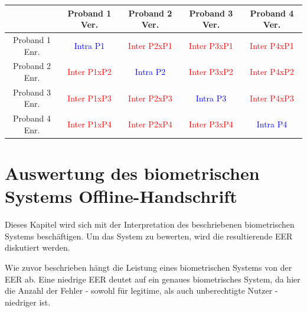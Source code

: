 \documentclass{article}
\begin{document}
\begin{tabular}{ |c|c|c|c|c| } 
  \hline
                 & Proband 1 Ver.               & Proband 2 Ver.               & Proband 3 Ver.               & Proband 4 Ver. \\
  \hline
  Proband 1 Enr. & \textcolor{blue}{Intra P1}   & \textcolor{red}{Inter P2xP1} & \textcolor{red}{Inter P3xP1} & \textcolor{red}{Inter P4xP1} \\
  \hline
  Proband 2 Enr. & \textcolor{red}{Inter P1xP2} & \textcolor{blue}{Intra P2}   & \textcolor{red}{Inter P3xP2} & \textcolor{red}{Inter P4xP2} \\
  \hline
  Proband 3 Enr. & \textcolor{red}{Inter P1xP3} & \textcolor{red}{Inter P2xP3} & \textcolor{blue}{Intra P3}   & \textcolor{red}{Inter P4xP3} \\
  \hline
  Proband 4 Enr. & \textcolor{red}{Inter P1xP4} & \textcolor{red}{Inter P2xP4} & \textcolor{red}{Inter P3xP4} & \textcolor{blue}{Intra P4} \\
  \hline
\end{tabular}


\section{Auswertung des biometrischen Systems Offline-Handschrift}

Dieses Kapitel wird sich mit der Interpretation des beschriebenen biometrischen Systems beschäftigen.
Um das System zu bewerten, wird die resultierende EER diskutiert werden.

Wie zuvor beschrieben hängt die Leistung eines biometrischen Systems von der EER ab. Eine niedrige
EER deutet auf ein genaues biometrisches System, da hier die Anzahl der Fehler - sowohl für legitime,
als auch unberechtigte Nutzer - niedriger ist. 
\end{document}
